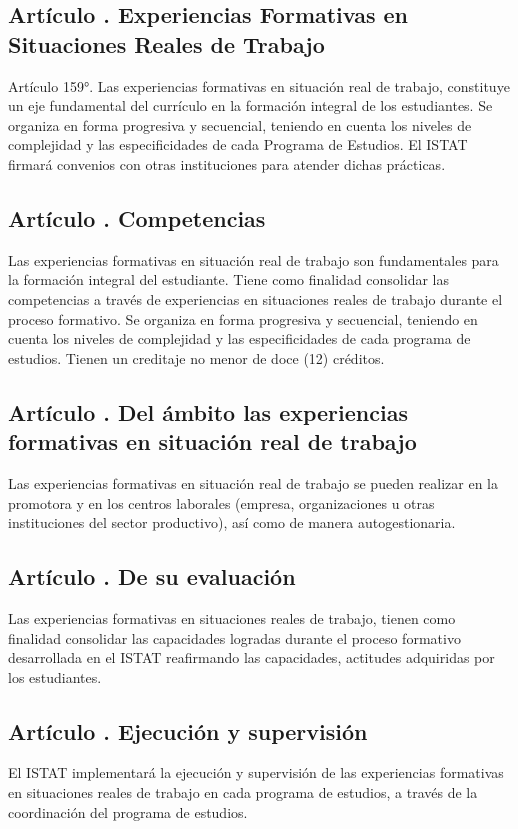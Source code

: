 \subsection{Artículo . Experiencias Formativas en Situaciones Reales de Trabajo}
\addtocounter{ns}{1}
Artículo 159°.	Las experiencias formativas en situación real de trabajo, constituye un eje fundamental del currículo en la formación integral de los estudiantes. Se organiza en forma progresiva y secuencial, teniendo en cuenta los niveles de complejidad y las especificidades de cada Programa de Estudios. El ISTAT firmará convenios con otras instituciones para atender dichas prácticas. 
\subsection{Artículo . Competencias}
\addtocounter{ns}{1}
Las experiencias formativas en situación real de trabajo son fundamentales para la formación integral del estudiante. Tiene como finalidad consolidar las competencias a través de experiencias en situaciones reales de trabajo durante el proceso formativo. Se organiza en forma progresiva y secuencial, teniendo en cuenta los niveles de complejidad y las especificidades de cada programa de estudios. Tienen un creditaje no menor de doce (12) créditos. 
\subsection{Artículo . Del ámbito las experiencias formativas en situación real de trabajo}
\addtocounter{ns}{1}
Las experiencias formativas en situación real de trabajo se pueden realizar en la promotora y en los centros laborales (empresa, organizaciones u otras instituciones del sector productivo), así como de manera autogestionaria. 
\subsection{Artículo . De su evaluación}
\addtocounter{ns}{1}
Las experiencias formativas en situaciones reales de trabajo, tienen como finalidad consolidar las capacidades logradas durante el proceso formativo desarrollada en el ISTAT reafirmando las capacidades, actitudes adquiridas por los estudiantes.
\subsection{Artículo . Ejecución y supervisión}
\addtocounter{ns}{1}
El ISTAT implementará la ejecución y supervisión de las experiencias formativas en situaciones reales de trabajo en cada programa de estudios, a través de la coordinación del programa de estudios. 

